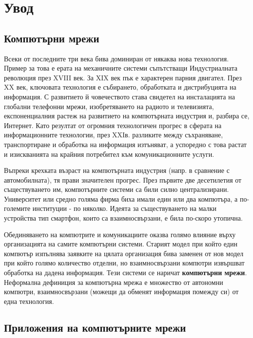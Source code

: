 \documentclass[12pt,a4paper,oneside]{book}
\begin{document}
\pagestyle{empty}

\pagestyle{plain}

\tableofcontents
\vfill
\chapter*{Увод}

\section{Компютърни мрежи}

Всеки от последните три века бива доминиран от някаква нова технология. Пример
за това е ерата на механичните системи съпътстващи Индустриалната революция през
XVIII век. За XIX век пък е характерен парния двигател. През XX век, ключовата
технология е събирането, обработката и дистрибуцията на информация. С развитието
й човечеството става свидетел на инсталацията на глобални телефонни мрежи,
изобретяването на радиото и телевизията, експоненциалния растеж на развитието на
компютърната индустрия и, разбира се, Интернет. Като резултат от огромния
технологичен прогрес в сферата на информационните технологии, през XXIв.
разликите между съхраняване, транспортиране и обработка на информация изтъняват,
а успоредно с това растат и изискванията на крайния потребител към
комуникационните услуги.

Въпреки крехката възраст на компютърната индустрия (напр. в сравнение с
автомобилната), тя прави значителен прогрес. През първите две десетилетия от
съществуването им, компютърните системи са били силно централизирани.
Университет или средно голяма фирма биха имали един или два компютъра, а
по-големите институции - по няколко. Идеята за съществуването на малки
устройства тип смартфон, които са взаимносвързани, е била по-скоро утопична.

Обединяването на компютрите и комуникациите оказва голямо влияние върху
организацията на самите компютърни системи. Старият модел при който един
компютър изпълнява заявките на цялата организация бива заменен от нов модел при
който голямо количество отделни, но взаимносвързани компютри извършват обработка
на дадена информация. Тези системи се наричат \textbf{компютърни мрежи}.
Неформална дефиниция за компютърна мрежа е множество от автономни компютри,
взаимносвързани (можещи да обменят информация помежду си) от една технология.
\cite{tanenbaum_computer_2011}

\section{Приложения на компютърните мрежи}
\end{document}
